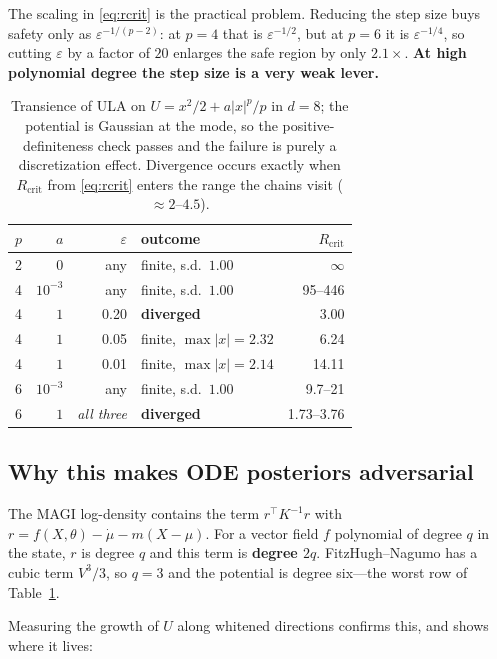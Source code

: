 \documentclass[11pt]{article}
\begin{document}
The scaling in \eqref{eq:rcrit} is the practical problem. Reducing the step size buys safety only
as $\varepsilon^{-1/(p-2)}$: at $p=4$ that is $\varepsilon^{-1/2}$, but at $p=6$ it is
$\varepsilon^{-1/4}$, so cutting $\varepsilon$ by a factor of $20$ enlarges the safe region by
only $2.1\times$. \textbf{At high polynomial degree the step size is a very weak lever.}

\begin{table}[t]
\centering
\begin{tabular}{rrrlr}
\toprule
$p$ & $a$ & $\varepsilon$ & outcome & $R_{\text{crit}}$ \\
\midrule
2 & $0$        & any   & finite, s.d.\ $1.00$        & $\infty$ \\
4 & $10^{-3}$  & any   & finite, s.d.\ $1.00$        & 95--446 \\
4 & $1$        & 0.20  & \textbf{diverged}           & 3.00 \\
4 & $1$        & 0.05  & finite, $\max|x| = 2.32$    & 6.24 \\
4 & $1$        & 0.01  & finite, $\max|x| = 2.14$    & 14.11 \\
6 & $10^{-3}$  & any   & finite, s.d.\ $1.00$        & 9.7--21 \\
6 & $1$        & \emph{all three} & \textbf{diverged} & 1.73--3.76 \\
\bottomrule
\end{tabular}
\caption{Transience of ULA on $U = x^2/2 + a|x|^p/p$ in $d=8$; the potential is Gaussian at the
mode, so the positive-definiteness check passes and the failure is purely a discretization
effect. Divergence occurs exactly when $R_{\text{crit}}$ from \eqref{eq:rcrit} enters the range
the chains visit ($\approx 2$--$4.5$).}
\label{tab:transience}
\end{table}

\subsection*{Why this makes ODE posteriors adversarial}

The MAGI log-density contains the term $r^{\!\top} K^{-1} r$ with
$r = f(X,\theta) - \dot\mu - m(X-\mu)$. For a vector field $f$ polynomial of degree $q$ in the
state, $r$ is degree $q$ and this term is \textbf{degree $2q$}. FitzHugh--Nagumo has a cubic
term $V^3/3$, so $q=3$ and the potential is degree six---the worst row of
Table~\ref{tab:transience}.

Measuring the growth of $U$ along whitened directions confirms this, and shows where it lives:
\end{document}
